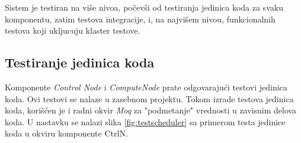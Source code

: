 \documentclass[12pt,oneside]{memoir}
\begin{document}


Sistem je testiran na više nivoa, počevši od testiranja jedinica koda za svaku komponentu, zatim testova integracije, i, na najvišem nivou, funkcionalnih testova koji ukljucuju klaster testove.

\subsection{Testiranje jedinica koda}
Komponente \emph{Control Node} i \emph{ComputeNode} prate odgovarajući testovi jedinica koda. Ovi testovi se nalaze u zasebnom projektu. Tokom izrade testova jedinica koda, korišćen je i radni okvir \emph{Moq} \cite{Moq} za "podmetanje" vrednosti u zavisnim delova koda. U nastavku se nalazi slika \ref{fig:testscheduler} sa primerom testa jedinice koda u okviru komponente CtrlN.
\end{document}
